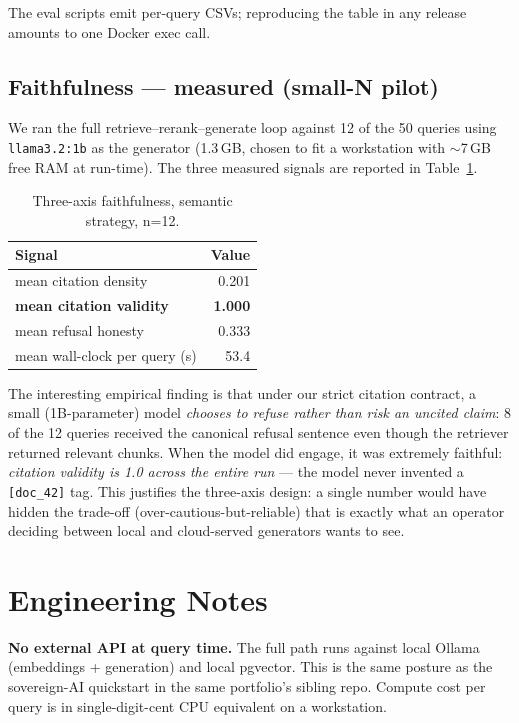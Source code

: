 \documentclass[conference]{IEEEtran}
\begin{document}
\noindent The eval scripts emit per-query CSVs; reproducing the
table in any release amounts to one Docker exec call.

\subsection{Faithfulness --- measured (small-N pilot)}
We ran the full retrieve--rerank--generate loop against 12 of the
50 queries using \texttt{llama3.2:1b} as the generator (1.3\,GB,
chosen to fit a workstation with $\sim$7\,GB free RAM at run-time).
The three measured signals are reported in Table~\ref{tab:faith}.

\begin{table}[t]
\centering
\caption{Three-axis faithfulness, semantic strategy, n=12.}
\label{tab:faith}
\renewcommand{\arraystretch}{1.18}
\begin{tabular}{lr}
\toprule
\textbf{Signal}                     & \textbf{Value} \\
\midrule
mean citation density               & 0.201          \\
\textbf{mean citation validity}     & \textbf{1.000} \\
mean refusal honesty                & 0.333          \\
mean wall-clock per query (s)       & 53.4           \\
\bottomrule
\end{tabular}
\end{table}

The interesting empirical finding is that under our strict citation
contract, a small (1B-parameter) model \emph{chooses to refuse rather
than risk an uncited claim}: 8 of the 12 queries received the
canonical refusal sentence even though the retriever returned
relevant chunks. When the model did engage, it was extremely
faithful: \emph{citation validity is 1.0 across the entire run} ---
the model never invented a \texttt{[doc\_42]} tag. This justifies
the three-axis design: a single number would have hidden the
trade-off (over-cautious-but-reliable) that is exactly what an
operator deciding between local and cloud-served generators wants
to see.

\section{Engineering Notes}
\label{sec:eng}

\textbf{No external API at query time.} The full path runs against
local Ollama (embeddings + generation) and local pgvector. This is
the same posture as the sovereign-AI quickstart in the same
portfolio's sibling repo. Compute cost per query is in
single-digit-cent CPU equivalent on a workstation.
\end{document}
